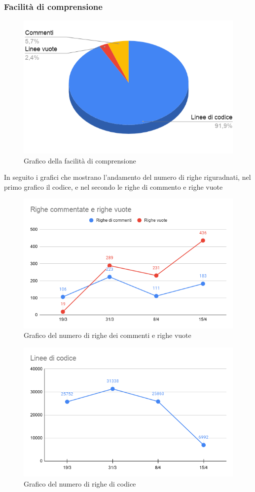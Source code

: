     \subsubsection{Facilità di comprensione}

        \begin{figure}[H]
            \centering
            \includegraphics[width=10 cm]{source/sections/images/facilitaDelCodice.png}
            \caption{Grafico della facilità di comprensione}
        \end{figure}

    In seguito i grafici che mostrano l'andamento del numero di righe riguradnati, nel primo grafico il codice, e nel secondo le righe di commento e righe vuote

    \begin{figure}[H]
        \centering
        \includegraphics[width=10 cm]{source/sections/images/Valori-delle-righe.png}
        \caption{Grafico del numero di righe dei commenti e righe vuote}
    \end{figure}

    \begin{figure}[H]
        \centering
        \includegraphics[width=10 cm]{source/sections/images/numCodice.png}
        \caption{Grafico del numero di righe di codice}
    \end{figure}

